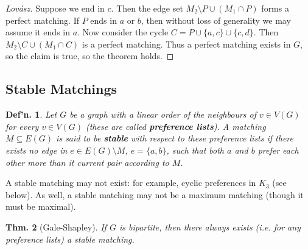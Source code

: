 \documentclass[12pt, a4paper]{book}
\newtheorem{theorem}{Thm.}[section]
\newtheorem{definition}[theorem]{Def'n.}
\theoremstyle{nonumberplain}
\newtheorem{proof}{Proof}
\begin{document}
\begin{proof}[Lov\'asz]
    Suppose we end in $c$.
    Then the edge set $M_2\setminus P\cup(M_1\cap P)$ forms a perfect matching.
    If $P$ ends in $a$ or $b$, then without loss of generality we may assume it ends in $a$.
    Now consider the cycle $C=P\cup\{a,c\}\cup\{c,d\}$.
    Then $M_2\setminus C\cup (M_1\cap C)$ is a perfect matching.
    Thus a perfect matching exists in $G$, so the claim is true, so the theorem holds.
\end{proof}
\subsection{Stable Matchings}
\begin{definition}
    Let $G$ be a graph with a linear order of the neighbours of $v\in V(G)$ for every $v\in V(G)$ (these are called \textbf{preference lists}).
    A matching $M\subseteq E(G)$ is said to be \textbf{stable} with respect to these preference lists if there exists no edge in $e\in E(G)\setminus M$, $e=\{a,b\}$, such that both $a$ and $b$ prefer each other more than it current pair according to $M$.
\end{definition}
A stable matching may not exist: for example, cyclic preferences in $K_3$ (see below).
As well, a stable matching may not be a maximum matching (though it must be maximal).
\begin{center}
\end{center}
\begin{theorem}[Gale-Shapley]
    If $G$ is bipartite, then there always exists (i.e. for any preference lists) a stable matching.
\end{theorem}
\end{document}

